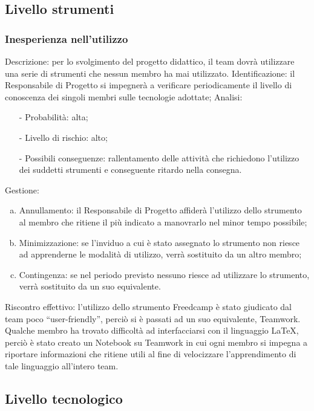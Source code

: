 \documentclass[../analisi_dei_rischi.tex]{subfiles}
\begin{document}
\subsection{Livello strumenti}

\subsubsection{Inesperienza nell’utilizzo}
	Descrizione: per lo svolgimento del progetto didattico, il team dovrà utilizzare una serie di strumenti che nessun membro ha mai utilizzato.
	Identificazione: il Responsabile di Progetto si impegnerà a verificare periodicamente il livello di conoscenza dei singoli membri sulle tecnologie adottate;
	Analisi:
	\begin{itemize}
		\item[-] Probabilità: alta;
		\item[-] Livello di rischio: alto;
		\item[-] Possibili conseguenze: rallentamento delle attività che richiedono l’utilizzo dei suddetti strumenti e conseguente ritardo nella consegna.
	\end{itemize}
	Gestione:
	\begin{enumerate}[(a)]
		\item Annullamento: il Responsabile di Progetto affiderà l’utilizzo dello strumento al membro che ritiene il più indicato a manovrarlo nel minor tempo possibile;
		\item Minimizzazione: se l’inviduo a cui è stato assegnato lo strumento non riesce ad apprenderne le modalità di utilizzo, verrà sostituito da un altro membro;
		\item Contingenza: se nel periodo previsto nessuno riesce ad utilizzare lo strumento, verrà sostituito da un suo equivalente. 
	\end{enumerate}	
	Riscontro effettivo: l’utilizzo dello strumento Freedcamp è stato giudicato dal team poco “user-friendly”, perciò si è passati ad un suo equivalente, Teamwork. 	Qualche membro ha trovato difficoltà ad interfacciarsi con il linguaggio LaTeX, perciò è stato creato un Notebook su Teamwork in cui ogni membro si impegna a riportare informazioni che ritiene utili al fine di velocizzare l’apprendimento di tale linguaggio all’intero team.

\subsection{Livello tecnologico}
\end{document}
